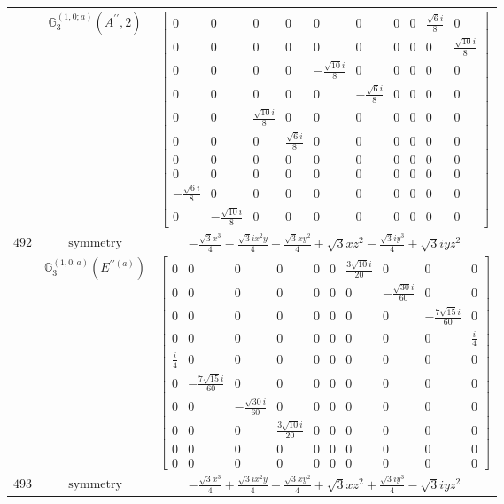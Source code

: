 \documentclass[fleqn,8pt,landscape]{jsarticle}
\begin{document}
\begin{longtable}{ccc}
$  $ & $ \mathbb{G}_{3}^{(1,0;a)}(A^{\prime\prime},2) $ & $ \begin{bmatrix} 0 & 0 & 0 & 0 & 0 & 0 & 0 & 0 & \frac{\sqrt{6} i}{8} & 0 \\ 0 & 0 & 0 & 0 & 0 & 0 & 0 & 0 & 0 & \frac{\sqrt{10} i}{8} \\ 0 & 0 & 0 & 0 & - \frac{\sqrt{10} i}{8} & 0 & 0 & 0 & 0 & 0 \\ 0 & 0 & 0 & 0 & 0 & - \frac{\sqrt{6} i}{8} & 0 & 0 & 0 & 0 \\ 0 & 0 & \frac{\sqrt{10} i}{8} & 0 & 0 & 0 & 0 & 0 & 0 & 0 \\ 0 & 0 & 0 & \frac{\sqrt{6} i}{8} & 0 & 0 & 0 & 0 & 0 & 0 \\ 0 & 0 & 0 & 0 & 0 & 0 & 0 & 0 & 0 & 0 \\ 0 & 0 & 0 & 0 & 0 & 0 & 0 & 0 & 0 & 0 \\ - \frac{\sqrt{6} i}{8} & 0 & 0 & 0 & 0 & 0 & 0 & 0 & 0 & 0 \\ 0 & - \frac{\sqrt{10} i}{8} & 0 & 0 & 0 & 0 & 0 & 0 & 0 & 0 \end{bmatrix} $ \\ \hline
$ 492 $ & $ \text{symmetry} $ & $ - \frac{\sqrt{3} x^{3}}{4} - \frac{\sqrt{3} i x^{2} y}{4} - \frac{\sqrt{3} x y^{2}}{4} + \sqrt{3} x z^{2} - \frac{\sqrt{3} i y^{3}}{4} + \sqrt{3} i y z^{2} $ \\
$  $ & $ \mathbb{G}_{3}^{(1,0;a)}(E^{\prime\prime(a)}) $ & $ \begin{bmatrix} 0 & 0 & 0 & 0 & 0 & 0 & \frac{3 \sqrt{10} i}{20} & 0 & 0 & 0 \\ 0 & 0 & 0 & 0 & 0 & 0 & 0 & - \frac{\sqrt{30} i}{60} & 0 & 0 \\ 0 & 0 & 0 & 0 & 0 & 0 & 0 & 0 & - \frac{7 \sqrt{15} i}{60} & 0 \\ 0 & 0 & 0 & 0 & 0 & 0 & 0 & 0 & 0 & \frac{i}{4} \\ \frac{i}{4} & 0 & 0 & 0 & 0 & 0 & 0 & 0 & 0 & 0 \\ 0 & - \frac{7 \sqrt{15} i}{60} & 0 & 0 & 0 & 0 & 0 & 0 & 0 & 0 \\ 0 & 0 & - \frac{\sqrt{30} i}{60} & 0 & 0 & 0 & 0 & 0 & 0 & 0 \\ 0 & 0 & 0 & \frac{3 \sqrt{10} i}{20} & 0 & 0 & 0 & 0 & 0 & 0 \\ 0 & 0 & 0 & 0 & 0 & 0 & 0 & 0 & 0 & 0 \\ 0 & 0 & 0 & 0 & 0 & 0 & 0 & 0 & 0 & 0 \end{bmatrix} $ \\ \hline
$ 493 $ & $ \text{symmetry} $ & $ - \frac{\sqrt{3} x^{3}}{4} + \frac{\sqrt{3} i x^{2} y}{4} - \frac{\sqrt{3} x y^{2}}{4} + \sqrt{3} x z^{2} + \frac{\sqrt{3} i y^{3}}{4} - \sqrt{3} i y z^{2} $ \\

\end{longtable}
\end{document}
